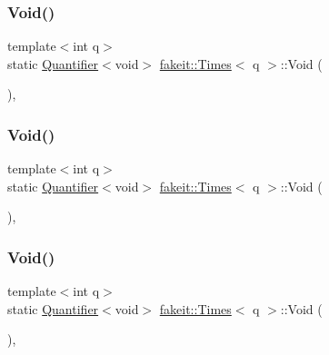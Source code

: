 \mbox{\label{structfakeit_1_1Times_ab473a1b456a5d360aff2fc5c4749ecae}} 
\subsubsection{\texorpdfstring{Void()}{Void()}\hspace{0.1cm}{\footnotesize\ttfamily [5/9]}}
{\footnotesize\ttfamily template$<$int q$>$ \\
static \mbox{\hyperlink{structfakeit_1_1Quantifier}{Quantifier}}$<$void$>$ \mbox{\hyperlink{structfakeit_1_1Times}{fakeit\+::\+Times}}$<$ q $>$\+::Void (\begin{DoxyParamCaption}{ }\end{DoxyParamCaption})\hspace{0.3cm}{\ttfamily [inline]}, {\ttfamily [static]}}

\mbox{\label{structfakeit_1_1Times_ab473a1b456a5d360aff2fc5c4749ecae}} 
\subsubsection{\texorpdfstring{Void()}{Void()}\hspace{0.1cm}{\footnotesize\ttfamily [6/9]}}
{\footnotesize\ttfamily template$<$int q$>$ \\
static \mbox{\hyperlink{structfakeit_1_1Quantifier}{Quantifier}}$<$void$>$ \mbox{\hyperlink{structfakeit_1_1Times}{fakeit\+::\+Times}}$<$ q $>$\+::Void (\begin{DoxyParamCaption}{ }\end{DoxyParamCaption})\hspace{0.3cm}{\ttfamily [inline]}, {\ttfamily [static]}}

\mbox{\label{structfakeit_1_1Times_ab473a1b456a5d360aff2fc5c4749ecae}} 
\subsubsection{\texorpdfstring{Void()}{Void()}\hspace{0.1cm}{\footnotesize\ttfamily [7/9]}}
{\footnotesize\ttfamily template$<$int q$>$ \\
static \mbox{\hyperlink{structfakeit_1_1Quantifier}{Quantifier}}$<$void$>$ \mbox{\hyperlink{structfakeit_1_1Times}{fakeit\+::\+Times}}$<$ q $>$\+::Void (\begin{DoxyParamCaption}{ }\end{DoxyParamCaption})\hspace{0.3cm}{\ttfamily [inline]}, {\ttfamily [static]}}

